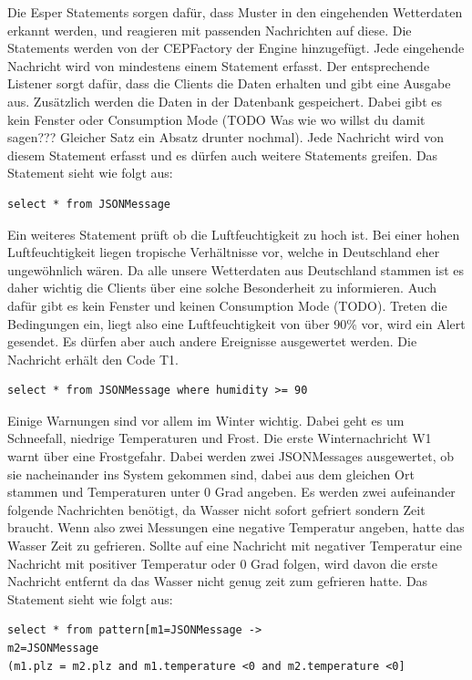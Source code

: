 Die Esper Statements sorgen dafür, dass Muster in den eingehenden Wetterdaten erkannt werden, und reagieren mit passenden Nachrichten auf diese. Die Statements werden von der CEPFactory der Engine hinzugefügt. Jede eingehende Nachricht wird von mindestens einem Statement erfasst. Der entsprechende Listener sorgt dafür, dass die Clients die Daten erhalten und gibt eine Ausgabe aus. Zusätzlich werden die Daten in der Datenbank gespeichert. Dabei gibt es kein Fenster oder Consumption Mode (TODO Was wie wo willst du damit sagen??? Gleicher Satz ein Absatz drunter nochmal). Jede Nachricht wird von diesem Statement erfasst und es dürfen auch weitere Statements greifen. Das Statement sieht wie folgt aus: 
\begin{lstlisting}
select * from JSONMessage
\end{lstlisting}
Ein weiteres Statement prüft ob die Luftfeuchtigkeit zu hoch ist. Bei einer hohen Luftfeuchtigkeit liegen tropische Verhältnisse vor, welche in Deutschland eher ungewöhnlich wären. Da alle unsere Wetterdaten aus Deutschland stammen ist es daher wichtig die Clients über eine solche Besonderheit zu informieren. Auch dafür gibt es kein Fenster und keinen Consumption Mode (TODO). Treten die Bedingungen ein, liegt also eine Luftfeuchtigkeit von über 90\% vor, wird ein Alert gesendet. Es dürfen aber auch andere Ereignisse ausgewertet werden.  Die Nachricht erhält den Code T1. 
\begin{lstlisting}
select * from JSONMessage where humidity >= 90
\end{lstlisting}
Einige Warnungen sind vor allem im Winter wichtig. Dabei geht es um Schneefall, niedrige Temperaturen und Frost. Die erste Winternachricht W1 warnt über eine Frostgefahr. Dabei werden zwei JSONMessages ausgewertet, ob sie nacheinander ins System gekommen sind, dabei aus dem gleichen Ort stammen und Temperaturen unter 0 Grad angeben. Es werden zwei aufeinander folgende Nachrichten benötigt, da Wasser nicht sofort gefriert sondern Zeit braucht. Wenn also zwei Messungen eine negative Temperatur angeben, hatte das Wasser Zeit zu gefrieren. Sollte auf eine Nachricht mit negativer Temperatur eine Nachricht mit positiver Temperatur oder 0 Grad folgen, wird davon die erste Nachricht entfernt da das Wasser nicht genug zeit zum gefrieren hatte. Das Statement sieht wie folgt aus: 
\begin{lstlisting}
select * from pattern[m1=JSONMessage ->
m2=JSONMessage
(m1.plz = m2.plz and m1.temperature <0 and m2.temperature <0]
\end{lstlisting}
